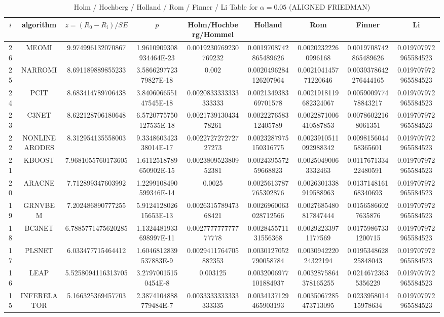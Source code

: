 \documentclass[a4paper,10pt]{article}
\begin{document}
\begin{landscape}
\begin{table}[!htp]
\centering\scriptsize
\caption{Holm / Hochberg / Holland / Rom / Finner / Li Table for $\alpha=0.05$ (ALIGNED FRIEDMAN)}
\begin{tabular}{ccccccccc}
$i$&algorithm&$z=(R_0 - R_i)/SE$&$p$&Holm/Hochberg/Hommel&Holland&Rom&Finner&Li\\
\hline
26&MEOMI&9.974996132070867&1.9610909308934464E-23&0.0019230769230769232&0.0019708742865489626&0.00202322260996168&0.0019708742865489626&0.019707972965584523\\
25&NARROMI&8.691189889855233&3.586629772379827E-18&0.002&0.0020496284126207964&0.002104145771220646&0.0039378642276444165&0.019707972965584523\\
24&PCIT&8.683414789706438&3.840606655147545E-18&0.0020833333333333333&0.002134938369701578&0.0021918119682324067&0.005900977478843217&0.019707972965584523\\
23&C3NET&8.622128706180648&6.5720775750127535E-18&0.002173913043478261&0.002227658312405789&0.0022871006410587853&0.00786022168061351&0.019707972965584523\\
22&NONLINEARODES&8.312954135558003&9.334860342338014E-17&0.002272727272727273&0.0023287975150316775&0.0023910511092988342&0.009815604458365601&0.019707972965584523\\
21&KBOOST&7.9681055760173605&1.6112518789650902E-15&0.002380952380952381&0.002439557259668823&0.00250490063332463&0.011767133422480591&0.019707972965584523\\
20&ARACNE&7.712899347603992&1.2299108490599346E-14&0.0025&0.0025613787765302876&0.0026301338919588963&0.013714816168340693&0.019707972965584523\\
19&GRNVBEM&7.202486890777255&5.912412802615653E-13&0.002631578947368421&0.0026960063028712566&0.0027685480817847444&0.01565866027635876&0.019707972965584523\\
18&BC3NET&6.7885771475620285&1.1324481933698997E-11&0.002777777777777778&0.002845571131556368&0.00292233971177569&0.01759867331200715&0.019707972965584523\\
17&PLSNET&6.033477715464412&1.6046812839537883E-9&0.0029411764705882353&0.0030127052790058784&0.003094222024322194&0.019534862825848043&0.019707972965584523\\
16&LEAP&5.5258094116313705&3.27970015150454E-8&0.003125&0.0032006977101884937&0.0032875864378165255&0.02146723635356229&0.019707972965584523\\
15&INFERELATOR&5.166325369457703&2.3874104888779484E-7&0.0033333333333333335&0.0034137129465903193&0.0035067285473713095&0.023395801415978634&0.019707972965584523\\

\end{tabular}
\end{table}
\end{landscape}
\end{document}
